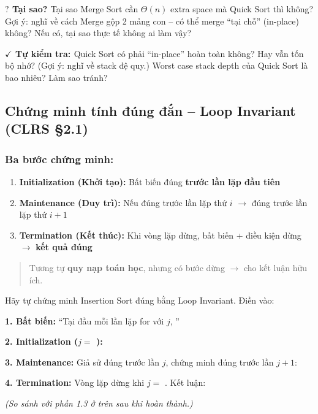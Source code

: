 \documentclass[10pt]{article}
\newcommand{\whyprompt}[1]{%
  \begin{tcolorbox}[colback=yellow!8!white, colframe=orange!70!yellow, leftrule=3pt,
    toprule=0pt, bottomrule=0pt, rightrule=0pt,
    boxsep=2pt, left=6pt, right=6pt, top=4pt, bottom=4pt]
  {\small\textbf{\textcolor{orange!80!black}{$\boldsymbol{?}$ Tại sao? }} #1}
  \end{tcolorbox}}
\newenvironment{traceyourself}[1]{%
  \begin{tcolorbox}[colback=green!5!white, colframe=green!60!black, leftrule=3pt,
    toprule=0pt, bottomrule=0pt, rightrule=0pt,
    boxsep=2pt, left=6pt, right=6pt, top=4pt, bottom=4pt,
    title={\small\textcolor{green!80!black}{$\triangleright$ Tự Trace: #1}}]
  \small
}{\end{tcolorbox}}
\newcommand{\checkpoint}[1]{%
  \begin{tcolorbox}[colback=orange!5!white, colframe=orange!70!black, leftrule=3pt,
    toprule=0pt, bottomrule=0pt, rightrule=0pt,
    boxsep=2pt, left=6pt, right=6pt, top=4pt, bottom=4pt]
  {\small\textbf{\textcolor{orange!80!black}{$\checkmark$ Tự kiểm tra: }} #1}
  \end{tcolorbox}}
\providecommand{\tightlist}{\setlength{\itemsep}{0pt}\setlength{\parskip}{0pt}}
\begin{document}
\whyprompt{Tại sao Merge Sort cần $\Theta(n)$ extra space mà Quick Sort thì không? Gợi ý: nghĩ về cách Merge gộp 2 mảng con -- có thể merge ``tại chỗ'' (in-place) không? Nếu có, tại sao thực tế không ai làm vậy?}

\checkpoint{Quick Sort có phải ``in-place'' hoàn toàn không? Hay vẫn tốn bộ nhớ? (Gợi ý: nghĩ về stack đệ quy.) Worst case stack depth của Quick Sort là bao nhiêu? Làm sao tránh?}

\subsection{\texorpdfstring{Chứng minh tính đúng đắn -- Loop
Invariant (CLRS
\S 2.1)}{Chứng minh tính đúng đắn -- Loop Invariant (CLRS 2.1)}}\label{chux1ee9ng-minh-tuxednh-ux111uxfang-ux111ux1eafn-loop-invariant-clrs-2.1}

\subsubsection{Ba bước chứng
minh:}\label{ba-bux1b0ux1edbc-chux1ee9ng-minh}

\begin{enumerate}
\def\labelenumi{\arabic{enumi}.}
\tightlist
\item
  \textbf{Initialization (Khởi tạo):} Bất biến đúng \textbf{trước lần
  lặp đầu tiên}
\item
  \textbf{Maintenance (Duy trì):} Nếu đúng trước lần lặp thứ \(i\)
  \(\to\) đúng trước lần lặp thứ \(i+1\)
\item
  \textbf{Termination (Kết thúc):} Khi vòng lặp dừng, bất biến + điều
  kiện dừng \(\to\) \textbf{kết quả đúng}
\end{enumerate}

\begin{quote}
Tương tự \textbf{quy nạp toán học}, nhưng có bước dừng \(\to\) cho kết
luận hữu ích.
\end{quote}

\begin{traceyourself}{Loop Invariant -- Điền 3 bước}
Hãy tự chứng minh Insertion Sort đúng bằng Loop Invariant. Điền vào:

\textbf{1. Bất biến:} ``Tại đầu mỗi lần lặp for với $j$, \underline{\hspace{8cm}}''

\textbf{2. Initialization ($j=$ \underline{\hspace{1cm}}):} \underline{\hspace{10cm}}

\textbf{3. Maintenance:} Giả sử đúng trước lần $j$, chứng minh đúng trước lần $j+1$:

\underline{\hspace{12cm}}

\textbf{4. Termination:} Vòng lặp dừng khi $j =$ \underline{\hspace{2cm}}. Kết luận: \underline{\hspace{6cm}}

\textit{(So sánh với phần 1.3 ở trên sau khi hoàn thành.)}
\end{traceyourself}
\end{document}
